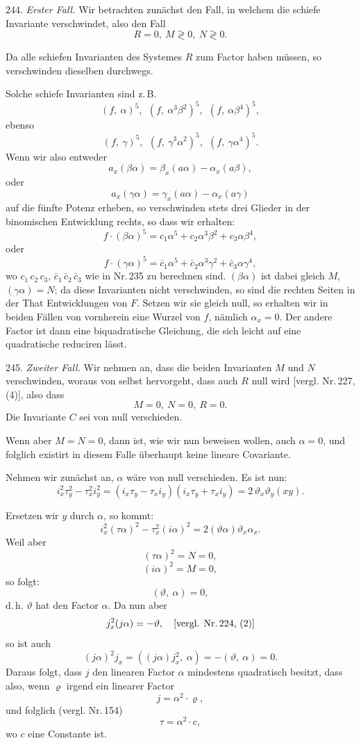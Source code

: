 \documentclass[11pt]{article}
\providecommand{\weberpage}[1]{}
\providecommand{\weq}[2]{\begin{equation}\tag{#1}#2\end{equation}}
\begin{document}
244. \textit{Erster Fall.} Wir betrachten zun\"achst den Fall, in welchem die schiefe Invariante verschwindet, also den Fall
\[
R=0,\ M\gtrless 0,\ N\gtrless 0.
\]

Da alle schiefen Invarianten des Systemes $R$ zum Factor haben m\"ussen, so verschwinden dieselben durchwegs.

Solche schiefe Invarianten sind z.\,B.
\[
(f,\ \alpha)^5,\ \ (f,\ \alpha^3\beta^2)^5,\ \ (f,\ \alpha\beta^4)^5,
\]
ebenso
\[
(f,\ \gamma)^5,\ \ (f,\ \gamma^3\alpha^2)^5,\ \ (f,\ \gamma\alpha^4)^5.
\]
Wenn wir also entweder
\[
a_x(\beta\alpha) = \beta_x(a\alpha) - \alpha_x(a\beta),
\]
oder
\[
a_x(\gamma\alpha) = \gamma_x(a\alpha) - \alpha_x(a\gamma)
\]
auf die f\"unfte Potenz erheben, so verschwinden stets drei Glieder in der binomischen Entwicklung rechts, so dass wir erhalten:
\[
f\cdot(\beta\alpha)^5 = c_1\alpha^5 + c_2\alpha^3\beta^2 + c_3\alpha\beta^4,
\]
oder
\[
f\cdot(\gamma\alpha)^5 = \bar c_1\alpha^5 + \bar c_2\alpha^3\gamma^2 + \bar c_3\alpha\gamma^4,
\]
wo $c_1\,c_2\,c_3$, $\bar c_1\,\bar c_2\,\bar c_3$ wie in Nr.\,235 zu berechnen sind. $(\beta\alpha)$ ist dabei gleich $M$, $(\gamma\alpha) = N$; da diese Invarianten nicht verschwinden, so sind die rechten Seiten in der That Entwicklungen von $F$. Setzen wir sie gleich null, so erhalten wir in beiden F\"allen von vornherein eine Wurzel von $f$, n\"amlich $\alpha_x=0$. Der andere Factor ist dann eine biquadratische Gleichung, die sich leicht auf eine quadratische reduciren l\"asst.

245. \textit{Zweiter Fall.} Wir nehmen an, dass die beiden Invarianten $M$ und $N$ verschwinden, woraus von selbst hervorgeht, dass auch $R$ null wird [vergl. Nr.\,227, (4)], also dass
\[
M=0,\ N=0,\ R=0.
\]
Die Invariante $C$ sei von null verschieden.

Wenn aber $M=N=0$, dann ist, wie wir nun beweisen wollen, auch $\alpha=0$, und folglich existirt in diesem Falle \"uberhaupt keine lineare Covariante.

Nehmen wir zun\"achst an, $\alpha$ w\"are von null verschieden. Es ist nun:
\weq{11}{i_x^2\tau_y^2 - \tau_x^2 i_y^2 = (i_x\tau_y - \tau_x i_y)(i_x\tau_y + \tau_x i_y) = 2\,\vartheta_x\vartheta_y(xy).}


\weberpage{271}
Ersetzen wir $y$ durch $\alpha$, so kommt:
\[
i_x^2(\tau\alpha)^2 - \tau_x^2(i\alpha)^2 = 2(\vartheta\alpha)\vartheta_x\alpha_x.
\]
Weil aber
\[
(\tau\alpha)^2 = N = 0,
\]
\[
(i\alpha)^2 = M = 0,
\]
so folgt:
\[
(\vartheta,\ \alpha) = 0,
\]
d.\,h. $\vartheta$ hat den Factor $\alpha$. Da nun aber
\[
j_x^2(j\alpha) = -\vartheta, \quad \text{[vergl. Nr.\,224, (2)]}
\]
so ist auch
\[
(j\alpha)^2 j_x = ((j\alpha)j_x^2,\ \alpha) = -(\vartheta,\ \alpha) = 0.
\]
Daraus folgt, dass $j$ den linearen Factor $\alpha$ mindestens quadratisch besitzt, dass also, wenn $\varrho$ irgend ein linearer Factor
\[
j = \alpha^2\cdot\varrho,
\]
und folglich (vergl. Nr.\,154)
\[
\tau = \alpha^2\cdot c,
\]
wo $c$ eine Constante ist.
\end{document}

